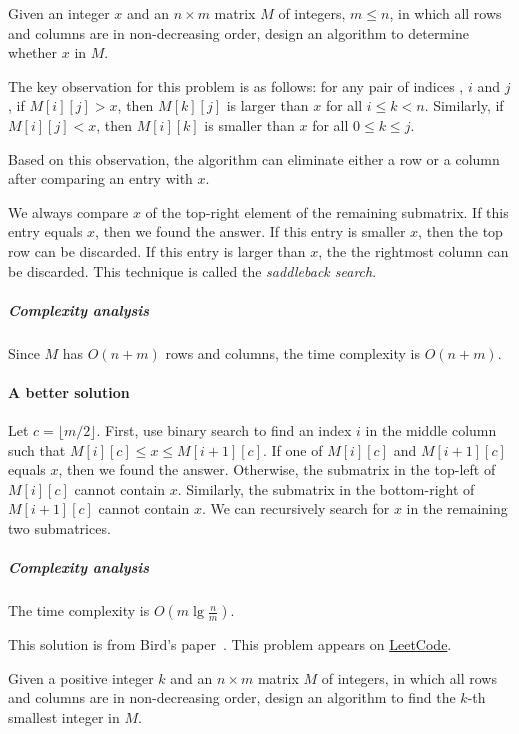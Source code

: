 \begin{Exercise}[title=Saddleback search]
Given an integer $x$  and an $n \times m$ matrix $M$ of integers, $m \leq n$, in which all rows and columns are in non-decreasing order, design an algorithm to determine whether $x$ in $M$.
\end{Exercise}
\begin{Answer}
The key observation for this problem is as follows: for any pair of indices , $i$ and $j$, if $M[i][j] > x$, then $M[k][j]$ is larger than $x$ for all $i \leq k < n$. Similarly, if $M[i][j] < x$, then $M[i][k]$ is smaller than $x$ for all $0 \leq k \leq j$.

Based on this observation, the algorithm can eliminate either a row or a column after comparing an entry with $x$.

We always compare $x$ of the top-right element of the remaining submatrix. If this entry equals $x$, then we found the answer. If this entry is smaller $x$, then the top row can be discarded. If this entry is larger than $x$, the the rightmost column can be discarded. This technique is called the \emph{saddleback search}.
\subparagraph{Complexity analysis} Since $M$ has $O(n + m)$ rows and columns, the time complexity is $O(n + m)$. 

\paragraph{A better solution} Let $c = \lfloor m / 2 \rfloor$. First, use binary search to find an index $i$ in the middle column such that $M[i][c] \leq x \leq M[i + 1][c]$. 
If one of $M[i][c]$ and $M[i + 1][c]$ equals $x$, then we found the answer. 
Otherwise, the submatrix in the top-left of $M[i][c]$ cannot contain $x$. Similarly, the submatrix in the bottom-right of $M[i + 1][c]$ cannot contain $x$. We can recursively search for $x$ in the remaining two submatrices. 
\subparagraph{Complexity analysis}  The time complexity is $O(m \lg \frac{n}{m})$.
\begin{remark}
This solution is from Bird's paper~\cite{Bird2006}. This problem appears on \href{https://leetcode.com/problems/search-a-2d-matrix-ii/}{LeetCode}.
\end{remark}
\end{Answer}

\begin{Exercise}[title=Selection in a sorted matrix]
Given a positive integer $k$ and an $n \times m$ matrix $M$ of integers, in which all rows and columns are in non-decreasing order, design an algorithm to find the $k$-th smallest integer in $M$.
\end{Exercise}


